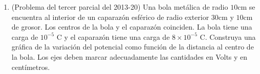 \documentclass{article}
\begin{document}
\begin{enumerate}
\item (Problema del tercer parcial del 2013-20) Una bola met\'alica de radio $10$cm se encuentra al
  interior de un caparaz\'on esf\'erico de radio exterior $30$cm y
  $10$cm de grosor. Los centros de la bola y el caparaz\'on coinciden.
  La bola tiene una carga de $10^{-5}$ C y el caparaz\'on tiene una
  carga de $8\times 10^{-5}$ C. Construya una gr\'afica de la
  variaci\'on del potencial como funci\'on de la distancia al centro
  de la bola. Los ejes deben marcar adecuadamente las cantidades en
  Volts y en cent\'imetros.  



\end{enumerate}
\end{document}
